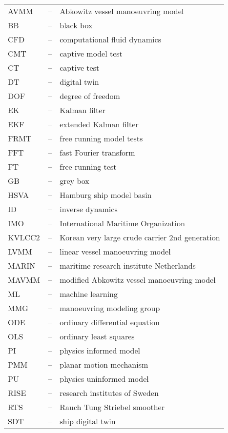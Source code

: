 
\begin{tabular}{ l c l }
AVMM & -- & Abkowitz vessel manoeuvring model\\
BB & -- & black box\\
CFD & -- & computational fluid dynamics\\
CMT & -- & captive model test \\
CT & -- & captive test \\
DT  & -- & digital twin\\
DOF & -- & degree of freedom\\
EK & -- & Kalman filter \\
EKF & -- & extended Kalman filter \\
FRMT & -- & free running model tests \\
FFT & -- & fast Fourier transform\\
FT & -- & free-running test\\
GB & -- & grey box\\
HSVA & -- & Hamburg ship model basin \\
ID & -- & inverse dynamics \\
IMO & -- & International Maritime Organization \\
KVLCC2 & -- & Korean very large crude carrier 2nd generation \\
LVMM & -- & linear vessel manoeuvring model\\
MARIN & -- & maritime research institute Netherlands \\
MAVMM & -- & modified Abkowitz vessel manoeuvring model\\
ML & -- & machine learning \\
MMG & -- & manoeuvring modeling group \\
ODE & -- & ordinary differential equation\\
OLS & -- & ordinary least squares\\
PI & -- & physics informed model \\ 
PMM & -- & planar motion mechanism \\ 
PU & -- & physics uninformed model \\
RISE & -- & research institutes of Sweden \\
RTS & -- & Rauch Tung Striebel smoother \\
SDT  & -- & ship digital twin\\

\end{tabular}
